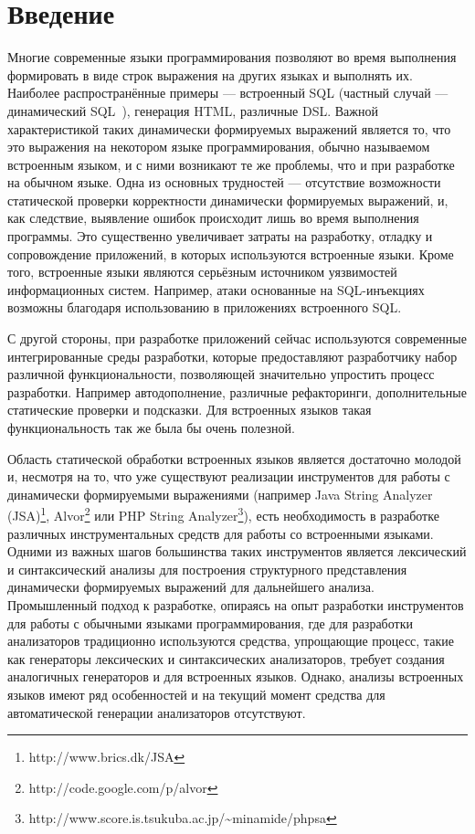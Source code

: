 \section*{Введение}
Многие современные языки программирования позволяют во время выполнения
формировать в виде строк выражения на других языках и выполнять их. Наиболее 
распространённые примеры — встроенный SQL (частный случай — динамический SQL~\cite{ISO}),
генерация HTML, различные DSL. Важной характеристикой таких динамически 
формируемых выражений является то, что это выражения на некотором языке 
программирования, обычно называемом встроенным языком, и с ними возникают те же
проблемы, что и при разработке на обычном языке. Одна из основных трудностей — 
отсутствие возможности статической проверки корректности динамически формируемых
выражений, и, как следствие, выявление ошибок происходит лишь во время выполнения
программы. Это существенно увеличивает затраты на разработку, отладку и 
сопровождение приложений, в которых используются встроенные языки. Кроме того, 
встроенные языки являются серьёзным источником уязвимостей информационных 
систем. Например, атаки основанные на SQL-инъекциях возможны благодаря 
использованию в приложениях встроенного SQL.

С другой стороны, при разработке приложений сейчас используются современные 
интегрированные среды разработки, которые предоставляют разработчику набор 
различной функциональности, позволяющей значительно упростить процесс разработки. 
Например автодополнение, различные рефакторинги, дополнительные статические 
проверки и подсказки. Для встроенных языков такая функциональность так же была 
бы очень полезной.

Область статической обработки встроенных языков является достаточно молодой и, 
несмотря на то, что уже существуют реализации инструментов для работы с 
динамически формируемыми выражениями  (например Java String Analyzer (JSA)\footnote{http://www.brics.dk/JSA}, 
Alvor\footnote{http://code.google.com/p/alvor} или PHP String Analyzer\footnote{http://www.score.is.tsukuba.ac.jp/\textasciitilde minamide/phpsa}), есть необходимость в разработке 
различных инструментальных средств для работы со встроенными языками. Одними из 
важных шагов большинства таких инструментов является  лексический и 
синтаксический анализы для построения структурного представления динамически 
формируемых выражений для дальнейшего анализа. Промышленный подход к разработке, 
опираясь на опыт разработки инструментов для работы с обычными языками 
программирования, где для разработки анализаторов традиционно используются 
средства, упрощающие процесс, такие как генераторы лексических и синтаксических 
анализаторов, требует создания аналогичных генераторов и для встроенных языков. 
Однако, анализы встроенных языков имеют ряд особенностей и на текущий момент 
средства для автоматической генерации анализаторов отсутствуют.

